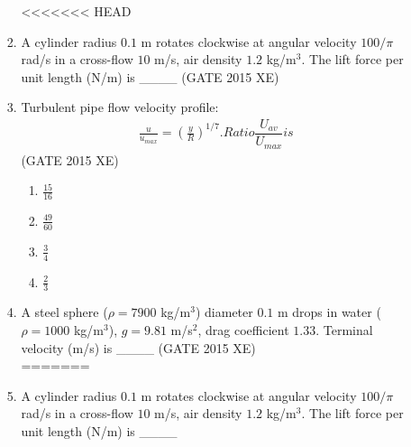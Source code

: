 \documentclass[journal,12pt,onecolumn]{IEEEtran}
\begin{document}
\begin{enumerate}
\begin{enumerate}
\begin{enumerate}[label=\arabic*)]
\begin{multicols}{2}
<<<<<<< HEAD
\end{multicols}

\item A cylinder radius $0.1$ m rotates clockwise at angular velocity $100/\pi$ rad/s in a cross-flow $10$ m/s, air density $1.2$ kg/m$^3$. The lift force per unit length (N/m) is \_\_\_\_
\hfill{(GATE 2015 XE)} \\


\item Turbulent pipe flow velocity profile: 
\begin{align}
\displaystyle \frac{u}{u_{max}} = \left(\frac{y}{R}\right)^{1/7}. Ratio \dfrac{U_{av}}{U_{max}} is 
\end{align}
\hfill{(GATE 2015 XE)} 
\begin{multicols}{4}
\begin{enumerate}
\item $\frac{15}{16}$
\item $\frac{49}{60}$
\item $\frac{3}{4}$
\item $\frac{2}{3}$
\end{enumerate}
\end{multicols}

\item A steel sphere ($\rho=7900$ kg/m$^3$) diameter $0.1$ m drops in water ($\rho=1000$ kg/m$^3$), $g=9.81$ m/s$^2$, drag coefficient $1.33$. Terminal velocity (m/s) is \_\_\_\_
\hfill{(GATE 2015 XE)} \\

\newpage
=======
\vspace{0.5cm}

\item A cylinder radius $0.1$ m rotates clockwise at angular velocity $100/\pi$ rad/s in a cross-flow $10$ m/s, air density $1.2$ kg/m$^3$. The lift force per unit length (N/m) is \_\_\_\_
\hfill{} \\


\end{enumerate}
\end{enumerate}
\end{enumerate}
\end{document}
